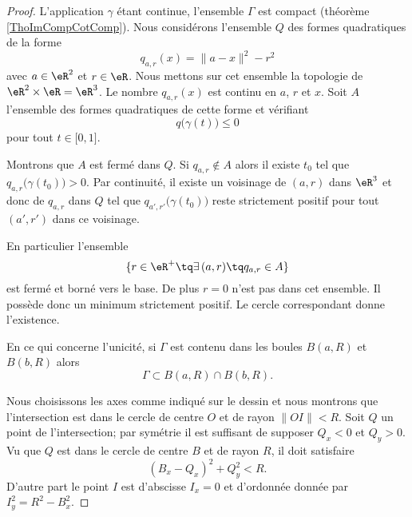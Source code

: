 \begin{proof}
    L'application \( \gamma\) étant continue, l'ensemble \( \Gamma\) est compact (théorème \ref{ThoImCompCotComp}). Nous considérons l'ensemble \( Q\) des formes quadratiques de la forme 
    \begin{equation}
        q_{a,r}(x)=\| a-x \|^2-r^2
    \end{equation}
    avec \( a\in \eR^2\) et \( r\in \eR\). Nous mettons sur cet ensemble la topologie de \( \eR^2\times \eR=\eR^3\). Le nombre \( q_{a,r}(x)\) est continu en \( a\), \( r\) et \( x\). Soit \( A\) l'ensemble des formes quadratiques de cette forme et vérifiant
    \begin{equation}
        q\big( \gamma(t) \big)\leq 0
    \end{equation}
    pour tout \( t\in\mathopen[ 0 , 1 \mathclose]\). 

    Montrons que \( A\) est fermé dans \( Q\). Si \( q_{a,r}\notin A\) alors il existe \( t_0\) tel que \( q_{a,r}\big( \gamma(t_0) \big)>0\). Par continuité, il existe un voisinage de \( (a,r)\) dans \( \eR^3\)  et donc de \( q_{a,r}\) dans \( Q\) tel que \( q_{a',r'}\big( \gamma(t_0) \big)\) reste strictement positif pour tout \( (a',r')\) dans ce voisinage.

    En particulier l'ensemble 
    \begin{equation}
        \{ r\in \eR^+\tq \exists\,(a,r)\tq q_{a,r}\in A \}
    \end{equation}
    est fermé et borné vers le base. De plus \( r=0\) n'est pas dans cet ensemble. Il possède donc un minimum strictement positif. Le cercle correspondant donne l'existence.

    En ce qui concerne l'unicité, si \( \Gamma\) est contenu dans les boules \( B(a,R)\) et \( B(b,R)\) alors 
    \begin{equation}
        \Gamma\subset B(a,R)\cap B(b,R).
    \end{equation}

    \begin{center}
        
    \end{center}

    Nous choisissons les axes comme indiqué sur le dessin et nous montrons que l'intersection est dans le cercle de centre \( O\) et de rayon \( \| OI \|<R\). Soit \( Q\) un point de l'intersection; par symétrie il est suffisant de supposer \( Q_x<0\) et \( Q_y>0\). Vu que \( Q\) est dans le cercle de centre \( B\) et de rayon \( R\), il doit satisfaire
    \begin{equation}
        (B_x-Q_x)^2+Q_{y}^2<R.
    \end{equation}
    D'autre part le point \( I\) est d'abscisse \( I_x=0\) et d'ordonnée donnée par \( I_y^2=R^2-B_x^2\). 


\end{proof}
